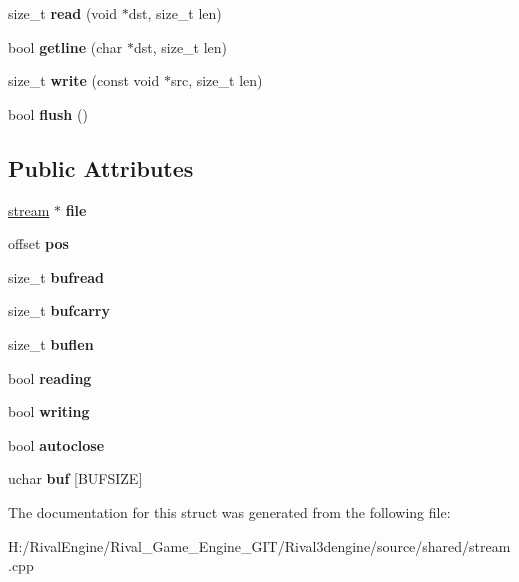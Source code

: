 \begin{DoxyCompactItemize}
size\+\_\+t {\bfseries read} (void $\ast$dst, size\+\_\+t len)
\item 
\mbox{\label{structutf8stream_ae7e5bf0d4525c3fc6a60b83a396fb843}} 
bool {\bfseries getline} (char $\ast$dst, size\+\_\+t len)
\item 
\mbox{\label{structutf8stream_aecdf9b0fa5c0b6966b185ab30788d6db}} 
size\+\_\+t {\bfseries write} (const void $\ast$src, size\+\_\+t len)
\item 
\mbox{\label{structutf8stream_a60bd7a6dbec98c37df0e1927b63be660}} 
bool {\bfseries flush} ()
\end{DoxyCompactItemize}
\subsection*{Public Attributes}
\begin{DoxyCompactItemize}
\item 
\mbox{\label{structutf8stream_ae8ab7140d92c0e539ad0c7782ae73303}} 
\hyperlink{structstream}{stream} $\ast$ {\bfseries file}
\item 
\mbox{\label{structutf8stream_a92f9abf025144af7b718ac0579b57583}} 
offset {\bfseries pos}
\item 
\mbox{\label{structutf8stream_a7c03abf01873a7f97f24619e9a8e376f}} 
size\+\_\+t {\bfseries bufread}
\item 
\mbox{\label{structutf8stream_af798efc9ea2c2b3d995c27afe8b6a4e2}} 
size\+\_\+t {\bfseries bufcarry}
\item 
\mbox{\label{structutf8stream_a96e1080fbb60ea669f740f1ec37f2aa0}} 
size\+\_\+t {\bfseries buflen}
\item 
\mbox{\label{structutf8stream_a6572149d75525352d94412c9e0feff11}} 
bool {\bfseries reading}
\item 
\mbox{\label{structutf8stream_a66044e654e225f2e57c483ed99a3ef3f}} 
bool {\bfseries writing}
\item 
\mbox{\label{structutf8stream_a9354bcdf0ffd11de250f23c4f1be6689}} 
bool {\bfseries autoclose}
\item 
\mbox{\label{structutf8stream_ac602a61dc12c6ff87f8025449a657835}} 
uchar {\bfseries buf} \mbox{[}B\+U\+F\+S\+I\+ZE\mbox{]}
\end{DoxyCompactItemize}


The documentation for this struct was generated from the following file\+:\begin{DoxyCompactItemize}
\item 
H\+:/\+Rival\+Engine/\+Rival\+\_\+\+Game\+\_\+\+Engine\+\_\+\+G\+I\+T/\+Rival3dengine/source/shared/stream.\+cpp\end{DoxyCompactItemize}
